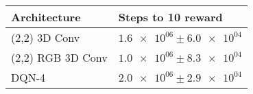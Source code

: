 \begin{tabular}{ll}
\hline
 Architecture      & Steps to 10 reward                \\
\hline
 (2,2) 3D Conv     & $\num{1.6e+06} \pm \num{6.0e+04}$ \\
 (2,2) RGB 3D Conv & $\num{1.0e+06} \pm \num{8.3e+04}$ \\
 DQN-4             & $\num{2.0e+06} \pm \num{2.9e+04}$ \\
\hline
\end{tabular}